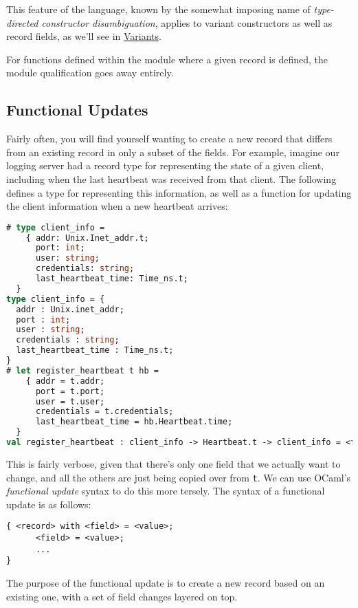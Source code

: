 This feature of the language, known by the somewhat imposing name of
\emph{type-directed constructor disambiguation}, applies to variant
constructors as well as record fields, as we'll see in
\href{variants.html\#variants}{Variants}.

For functions defined within the module where a given record is defined,
the module qualification goes away entirely.

\hypertarget{functional-updates}{%
\subsection{Functional Updates}\label{functional-updates}}

Fairly often, you will find yourself wanting to create a new record that
differs from an existing record in only a subset of the fields. For
example, imagine our logging server had a record type for representing
the state of a given client, including when the last heartbeat was
received from that client. The following defines a type for representing
this information, as well as a function for updating the client
information when a new heartbeat arrives:

\begin{lstlisting}[language=Caml]
# type client_info =
    { addr: Unix.Inet_addr.t;
      port: int;
      user: string;
      credentials: string;
      last_heartbeat_time: Time_ns.t;
  }
type client_info = {
  addr : Unix.inet_addr;
  port : int;
  user : string;
  credentials : string;
  last_heartbeat_time : Time_ns.t;
}
# let register_heartbeat t hb =
    { addr = t.addr;
      port = t.port;
      user = t.user;
      credentials = t.credentials;
      last_heartbeat_time = hb.Heartbeat.time;
  }
val register_heartbeat : client_info -> Heartbeat.t -> client_info = <fun>
\end{lstlisting}

This is fairly verbose, given that there's only one field that we
actually want to change, and all the others are just being copied over
from \passthrough{\lstinline!t!}. We can use OCaml's \emph{functional
update} syntax to do this more tersely. The syntax of a functional
update is as follows:

\begin{lstlisting}
{ <record> with <field> = <value>;
      <field> = <value>;
      ...
}
\end{lstlisting}

The purpose of the functional update is to create a new record based on
an existing one, with a set of field changes layered on top.


